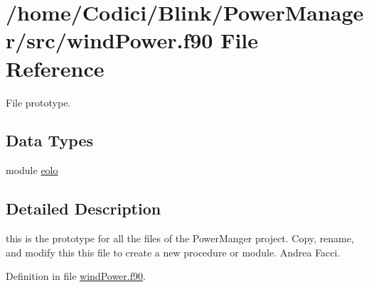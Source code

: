\hypertarget{wind_power_8f90}{\section{/home/\-Codici/\-Blink/\-Power\-Manager/src/wind\-Power.f90 File Reference}
\label{wind_power_8f90}
}


File prototype.  


\subsection*{Data Types}
\begin{DoxyCompactItemize}
\item 
module \hyperlink{classeolo}{eolo}
\end{DoxyCompactItemize}


\subsection{Detailed Description}
this is the prototype for all the files of the Power\-Manger project. Copy, rename, and modify this this file to create a new procedure or module.  Andrea Facci. 

Definition in file \hyperlink{wind_power_8f90_source}{wind\-Power.\-f90}.

